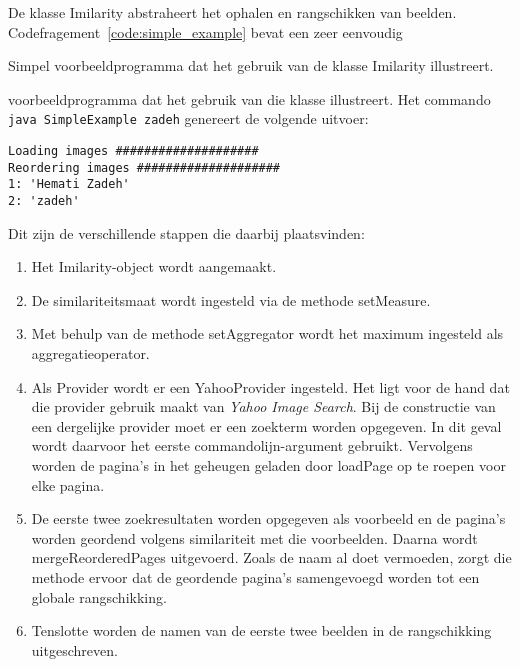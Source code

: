 De klasse {\klassefont Imilarity} abstraheert het ophalen en rangschikken van
beelden. Codefragement~\ref{code:simple_example} bevat een zeer eenvoudig 
\begin{code}[bp]
\vspace{5pt}
\begin{lgrind}

\end{lgrind}
\vspace{5pt}
\caption{\label{code:simple_example}Simpel voorbeeldprogramma dat het gebruik van
de klasse {\klassefont Imilarity} illustreert.}
\end{code}
voorbeeldprogramma dat het gebruik van die klasse illustreert. Het commando
\texttt{java SimpleExample zadeh} genereert de volgende uitvoer:
\begin{verbatim}
Loading images ####################
Reordering images ####################
1: 'Hemati Zadeh'
2: 'zadeh'
\end{verbatim} 
Dit zijn de verschillende stappen die daarbij plaatsvinden:
\begin{enumerate}
  \item Het {\klassefont Imilarity}-object wordt aangemaakt.
  \item De similariteitsmaat wordt ingesteld via de methode {\klassefont setMeasure}.
  \item Met behulp van de methode {\klassefont setAggregator} wordt het maximum ingesteld als
		aggregatieoperator. 
  \item Als {\klassefont Provider} wordt er een {\klassefont YahooProvider} ingesteld.
  	    Het ligt voor de hand dat die provider gebruik maakt van
  	    \emph{Yahoo Image Search}. Bij de constructie van een dergelijke provider
  	    moet er een zoekterm worden opgegeven. In dit geval wordt daarvoor het eerste 
  	    commandolijn-argument gebruikt. Vervolgens worden de pagina's in 
  	    het geheugen geladen door {\klassefont loadPage} op te roepen voor elke pagina.
  \item De eerste twee zoekresultaten worden opgegeven als voorbeeld en de pagina's
        worden geordend volgens similariteit met die voorbeelden. Daarna wordt
        {\klassefont mergeReorderedPages} uitgevoerd. Zoals de naam al doet vermoeden,
        zorgt die methode ervoor dat de geordende pagina's samengevoegd 
        worden tot een globale rangschikking.
  \item Tenslotte worden de namen van de eerste twee beelden in de rangschikking 
  	    uitgeschreven.
\end{enumerate}

